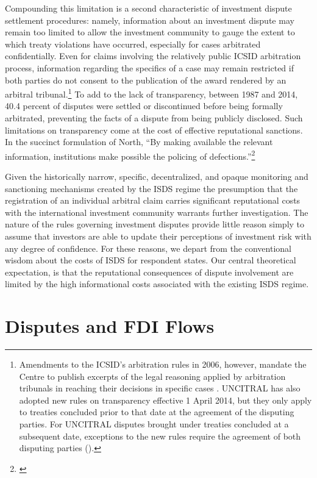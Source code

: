 \documentclass[12pt,onesided]{amsart}
\begin{document}
Compounding this limitation is a second characteristic of investment dispute settlement procedures: namely, information about an investment dispute may remain too limited to allow the investment community to gauge the extent to which treaty violations have occurred, especially for cases arbitrated confidentially. Even for claims involving the relatively public ICSID arbitration process, information regarding the specifics of a case may remain restricted if both parties do not consent to the publication of the award rendered by an arbitral tribunal.\footnote{Amendments to the ICSID's arbitration rules in 2006, however, mandate the Centre to publish excerpts of the legal reasoning applied by arbitration tribunals in reaching their decisions in specific cases \citep{antonietti:2006}. UNCITRAL has also adopted new rules on transparency effective 1 April 2014, but they only apply to treaties concluded prior to that date at the agreement of the disputing parties. For UNCITRAL disputes brought under treaties concluded at a subsequent date, exceptions to the new rules require the agreement of both disputing parties (\citealp[p. 33--40]{uncitral:2013}).} To add to the lack of transparency, between 1987 and 2014, 40.4 percent of disputes were settled or discontinued before being formally arbitrated, preventing the facts of a dispute from being publicly disclosed. Such limitations on transparency come at the cost of effective reputational sanctions. In the succinct formulation of North, ``By making available the relevant information, institutions make possible the policing of defections.''\footnote{\citet[p. 57]{north1990institutions}} 

Given the historically narrow, specific, decentralized, and opaque monitoring and sanctioning mechanisms created by the ISDS regime the presumption that the registration of an individual arbitral claim carries significant reputational costs with the international investment community warrants further investigation. The nature of the rules governing investment disputes provide little reason simply to assume that investors are able to update their perceptions of investment risk with any degree of confidence. For these reasons, we depart from the conventional wisdom about the costs of ISDS for respondent states. Our central theoretical expectation, is that the reputational consequences of dispute involvement are limited by the high informational costs associated with the existing ISDS regime. 

\section*{Disputes and FDI Flows}
\end{document}
